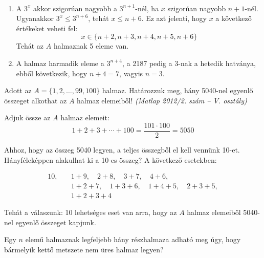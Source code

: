 \begin{solution}
	~
	\begin{enumerate}
		\item A $3^{x}$ akkor szigorúan nagyobb a $3^{n+1}$-nél, ha $x$ szigorúan
		nagyobb $n+1$-nél. Ugyanakkor $3^{x}\leq3^{n+6}$, tehát $x\leq n+6$.
		Ez azt jelenti, hogy $x$ a következő értékeket veheti fel: 
		\[
		x\in\{n+2,n+3,n+4,n+5,n+6\}
		\]
		Tehát az $A$ halmaznak 5 eleme van.
		\item A halmaz harmadik eleme a $3^{n+4}$, a 2187 pedig a 3-nak a hetedik
		hatványa, ebből következik, hogy $n+4=7$, vagyis $n=3$. 
	\end{enumerate}
\end{solution}
\begin{extraproblem}
	Adott az $A=\{1,2,\dots,99,100\}$ halmaz. Határozzuk meg, hány 5040-nel
	egyenlő összeget alkothat az $A$ halmaz elemeiből! \textit{(Matlap
		2012/2. szám -- V. osztály)}
\end{extraproblem}
\begin{solution}
	Adjuk össze az $A$ halmaz elemeit: 
	\[
	1+2+3+\cdots+100=\frac{101\cdot100}{2}=5050
	\]
	
	Ahhoz, hogy az összeg 5040 legyen, a teljes összegből el kell vennünk
	10-et. Hányféleképpen alakulhat ki a 10-es összeg? A következő esetekben:
	
	\begin{align*}
		10,\quad & 1+9,\quad2+8,\quad3+7,\quad4+6,\\
		& 1+2+7,\quad1+3+6,\quad1+4+5,\quad2+3+5,\\
		& 1+2+3+4
	\end{align*}
	
	Tehát a válaszunk: 10 lehetséges eset van arra, hogy az $A$ halmaz
	elemeiből 5040-nel egyenlő összeget kapjunk.
\end{solution}
\begin{extraproblem}
	Egy $n$ elemű halmaznak legfeljebb hány részhalmaza adható meg úgy,
	hogy bármelyik kettő metszete nem üres halmaz legyen?
\end{extraproblem}

